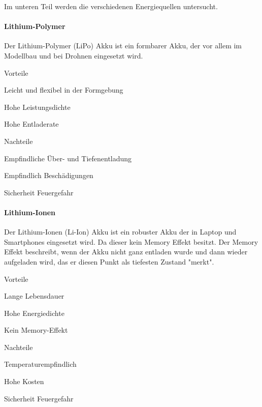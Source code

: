 Im unteren Teil werden die verschiedenen Energiequellen untersucht.

\paragraph{Lithium-Polymer}
Der Lithium-Polymer (LiPo) Akku ist ein formbarer Akku, der vor allem im Modellbau und bei Drohnen eingesetzt wird.
 

\begin{minipage}[t]{0.48\textwidth}
\begin{items}
  \item [Vorteile]
  \item Leicht und flexibel in der Formgebung
  \item Hohe Leistungsdichte
  \item Hohe Entladerate
\end{items}
\end{minipage}
\hfill
\begin{minipage}[t]{0.48\textwidth}
\begin{items}
  \item [Nachteile]
  \item Empfindliche Über- und Tiefenentladung
  \item Empfindlich Beschädigungen
  \item Sicherheit Feuergefahr
\end{items}
\end{minipage}


\paragraph{Lithium-Ionen}

Der Lithium-Ionen (Li-Ion) Akku ist ein robuster Akku der in Laptop und Smartphones eingesetzt wird. Da dieser kein Memory Effekt besitzt. Der Memory Effekt beschreibt, wenn der Akku nicht ganz entladen wurde und dann wieder aufgeladen wird, das er diesen Punkt als tiefesten Zustand "merkt".

\begin{minipage}[t]{0.48\textwidth}
\begin{items}
  \item [Vorteile]
  \item Lange Lebensdauer
  \item Hohe Energiedichte
  \item Kein Memory-Effekt
\end{items}
\end{minipage}
\hfill
\begin{minipage}[t]{0.48\textwidth}
\begin{items}
  \item [Nachteile]
  \item Temperaturempfindlich
  \item Hohe Kosten
  \item Sicherheit Feuergefahr
\end{items}
\end{minipage}
 

